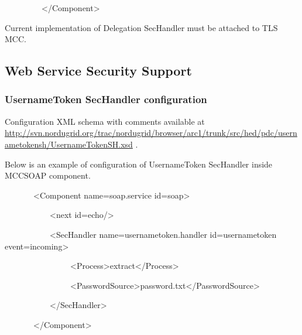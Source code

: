 \documentclass{article}
\begin{document}
{\ttfamily\color{black}
\ \ \ \ \ \ \ \ \ {\textless}/Component{\textgreater}}

{\upshape\color{black}
Current implementation of Delegation\textbf{ }SecHandler must be
attached to TLS MCC. }

\subsection[Web Service Security Support]{\color{black} Web Service
Security Support}
\subsubsection[UsernameToken SecHandler configuration]{UsernameToken
SecHandler configuration}
{\upshape\color{black}
Configuration XML schema with comments available at
\url{http://svn.nordugrid.org/trac/nordugrid/browser/arc1/trunk/src/hed/pdc/usernametokensh/UsernameTokenSH.xsd}
.}

{\upshape\color{black}
Below is an example of configuration of UsernameToken SecHandler inside
MCCSOAP component.}

{\ttfamily\color{black}
\ \ \ \ \ \ \ {\textless}Component
name={\textquotedbl}soap.service{\textquotedbl}
id={\textquotedbl}soap{\textquotedbl}{\textgreater}}

{\ttfamily\color{black}
\ \ \ \ \ \ \ \ \ \ \ {\textless}next
id={\textquotedbl}echo{\textquotedbl}/{\textgreater}}

{\ttfamily\color{black}
\ \ \ \ \ \ \ \ \ \ \ {\textless}SecHandler
name={\textquotedbl}usernametoken.handler{\textquotedbl}
id={\textquotedbl}usernametoken{\textquotedbl}
event={\textquotedbl}incoming{\textquotedbl}{\textgreater}}

{\ttfamily\color{black}
\ \ \ \ \ \ \ \ \ \ \ \ \ \ \ \ {\textless}Process{\textgreater}extract{\textless}/Process{\textgreater}}

{\ttfamily\color{black}
\ \ \ \ \ \ \ \ \ \ \ \ \ \ \ \ {\textless}PasswordSource{\textgreater}password.txt{\textless}/PasswordSource{\textgreater}}

{\ttfamily\color{black}
\ \ \ \ \ \ \ \ \ \ \ {\textless}/SecHandler{\textgreater}}

{\ttfamily\color{black}
\ \ \ \ \ \ \ {\textless}/Component{\textgreater}}
\end{document}
